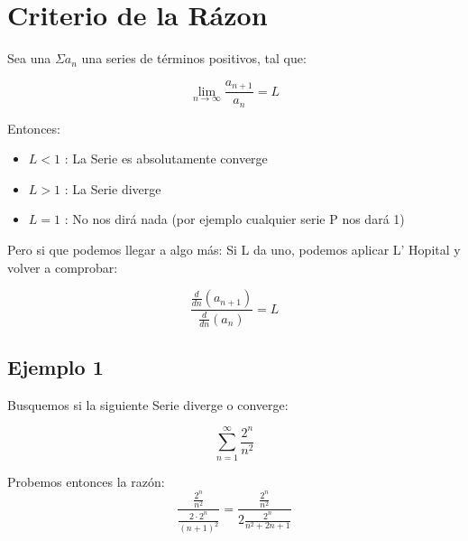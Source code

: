 \documentclass[12pt]{report}							    %
\begin{document}
    \section{Criterio de la Rázon}

        Sea una $\Sigma a_n$ una series de términos positivos, tal que:

        \begin{equation}
            \lim_{n \to \infty} \frac{a_{n+1}}{a_n} = L
        \end{equation}

        Entonces:
        \begin{itemize}
            \item $L < 1$ : La Serie es absolutamente converge
            \item $L > 1$ : La Serie diverge
            \item $L = 1$ : No nos dirá nada (por ejemplo cualquier serie P nos dará 1)
        \end{itemize}

        Pero si que podemos llegar a algo más:
        Si L da uno, podemos aplicar L' Hopital y volver a comprobar:

        \begin{equation}
        \frac{\frac{d}{dn} (a_{n+1})}{\frac{d}{dn} (a_n)} = L
        \end{equation}



        \subsection{Ejemplo 1}
        Busquemos si la siguiente Serie diverge o converge:

        \begin{equation*}
            \sum_{n=1}^{\infty} \frac{2^n}{n^2}
        \end{equation*}

        Probemos entonces la razón:
        \begin{equation*}
            \frac{ \frac{2^n}{n^2} }{ \frac{2 \cdot 2^n}{(n+1)^2 } } = \frac{ \frac{2^n}{n^2} }{ 2 \frac{2^n}{n^2 + 2n + 1} }
        \end{equation*}



    \clearpage
\end{document}
